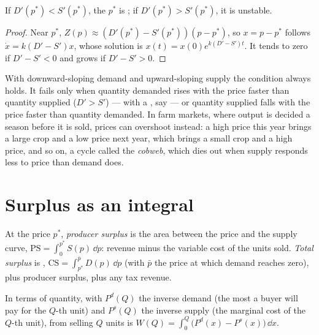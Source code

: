 \begin{proposition}[Stability]\label{prop:b1:partial-equilibrium-welfare:stability}
If $D'(p^*) < S'(p^*)$, the  $p^*$ is ; if $D'(p^*) > S'(p^*)$, it is
unstable.
\end{proposition}

\begin{proof}
Near $p^*$, $Z(p) \approx (D'(p^*) - S'(p^*))(p - p^*)$, so $x = p - p^*$ follows
$\dot x = k(D' - S')x$, whose solution is $x(t) = x(0)e^{k(D' - S')t}$. It tends to zero
if $D' - S' < 0$ and grows if $D' - S' > 0$.
\end{proof}

With downward-sloping demand and upward-sloping supply the condition
always holds. It fails only when quantity demanded rises with the price
faster than quantity supplied ($D' > S'$) --- with a , say --- or
quantity supplied falls with the price faster than quantity demanded. In farm markets, where output is decided a season before it is
sold, prices can overshoot instead: a high price this year brings a large
crop and a low price next year, which brings a small crop and a high
price, and so on, a cycle called the \emph{cobweb}, which dies out when
supply responds less to price than demand does.

\section{Surplus as an integral}\label{sec:b1:partial-equilibrium-welfare:surplus}

\begin{definition}\label{def:b1:partial-equilibrium-welfare:surplus}
At the price $p^*$, \emph{producer surplus} is the area between the price and
the supply curve, $\mathrm{PS} = \int_0^{p^*}S(p)\,\dd p$: revenue minus the variable
cost of the units sold. \emph{Total surplus} is ,
$\mathrm{CS} = \int_{p^*}^{\bar p}D(p)\,\dd p$ (with $\bar p$ the price at which demand
reaches zero), plus producer surplus, plus any tax revenue.
\end{definition}

In terms of quantity, with $P^d(Q)$ the inverse demand (the most a buyer will
pay for the $Q$-th unit) and $P^s(Q)$ the inverse supply (the marginal cost of
the $Q$-th unit),  from selling $Q$ units is
$W(Q) = \int_0^Q\bigl(P^d(x) - P^s(x)\bigr)\,\dd x$.

